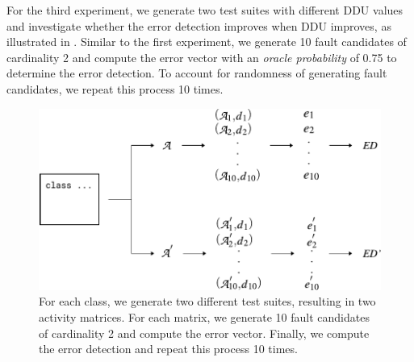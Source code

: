 \documentclass[twoside,a4paper,11pt]{memoir}
\begin{document}
For the third experiment, we generate two test suites with different DDU values and investigate whether the error detection improves when DDU improves, as illustrated in .
Similar to the first experiment, we generate 10 fault candidates of cardinality 2 and compute the error vector with an \emph{oracle probability} of 0.75 to determine the error detection.
To account for randomness of generating fault candidates, we repeat this process 10 times.
\begin{figure}
  \includegraphics[width=\linewidth]{figures/delta_error_detection_approach}
  \caption{For each class, we generate two different test suites, resulting in two activity matrices. For each matrix, we generate 10 fault candidates of cardinality 2 and compute the error vector. Finally, we compute the error detection and repeat this process 10 times.}%
  \label{fig:delta_error_detection_approach}
\end{figure}
\end{document}
